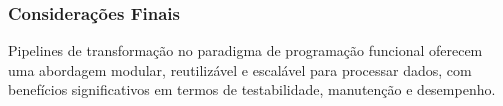 \subsubsection*{Considerações Finais}
Pipelines de transformação no paradigma de programação funcional oferecem uma abordagem modular, reutilizável e escalável para processar dados, com benefícios significativos em termos de testabilidade, manutenção e desempenho.


    


